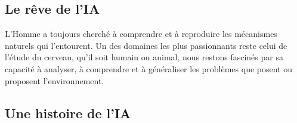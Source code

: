 \subsection{Le rêve de l'IA}
L’Homme a toujours cherché à comprendre et à reproduire les mécanismes naturels qui l'entourent. Un des domaines les plus passionnants reste celui de l'étude du cerveau, qu'il soit humain ou animal, nous restons fascinés par sa capacité à analyser, à comprendre et à généraliser les problèmes que posent ou \og proposent \fg{} l'environnement.
\subsection{Une histoire de l'IA}